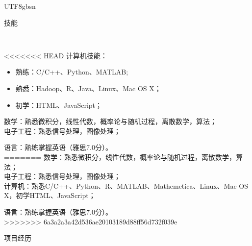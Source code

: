 \documentclass[9pt]{article}
\newenvironment{changemargin}[2]{%
  \begin{list}{}{%
    \setlength{\topsep}{0pt}%
    \setlength{\leftmargin}{#1}%
    \setlength{\rightmargin}{#2}%
    \setlength{\listparindent}{\parindent}%
    \setlength{\itemindent}{\parindent}%
    \setlength{\parsep}{\parskip}%
  }%
  \item[]}{\end{list}
}
\newcommand{\lineover}{
    \begin{changemargin}{-0.05in}{-0.05in}
        \vspace*{-8pt}
        \hrulefill \\
        \vspace*{-2pt}
    \end{changemargin}
}
\newcommand{\header}[1]{
    \begin{changemargin}{-0.5in}{-0.5in}
        \scshape{#1}\\
    \lineover
    \end{changemargin}
}
\newenvironment{body} {
    \vspace*{-16pt}
    \begin{changemargin}{-0.25in}{-0.5in}
  } 
    {\end{changemargin}
}
\begin{document}
\begin{CJK*}{UTF8}{gbsn}
\begin{body}
\end{body}

\smallskip
\smallskip
\smallskip

\header{技能}

\begin{body}
<<<<<<< HEAD
    \vspace{14pt}
    计算机技能：
    \begin{itemize}
    \itemsep 0pt
    \item 熟练：C/C++、Python、MATLAB;
    \item 熟悉：Hadoop、R、Java、Linux、Mac OS X；
    \item 初学：HTML、JavaScript；
    \end{itemize}

    \smallskip
    数学：熟悉微积分，线性代数，概率论与随机过程，离散数学，算法；\\
    \smallskip
    电子工程：熟悉信号处理，图像处理；\\
    \smallskip
    

    语言：熟练掌握英语（雅思7.0分）。\\
=======
	\vspace{14pt}
	数学：熟悉微积分，线性代数，概率论与随机过程，离散数学，算法；\\
	\smallskip
	电子工程：熟悉信号处理，图像处理；\\
	\smallskip
	计算机：熟悉C/C++、Python、R、MATLAB、Mathemetica、Linux、Mac OS X，初学HTML、JavaScript；\\
	\smallskip

	语言：熟练掌握英语（雅思7.0分）。\\
>>>>>>> 6a3a2a3a42d536ae20103189d88ff56d732f039e
\end{body}
\smallskip
\smallskip
\smallskip

\header{项目经历}


\end{CJK*}
\end{document}
